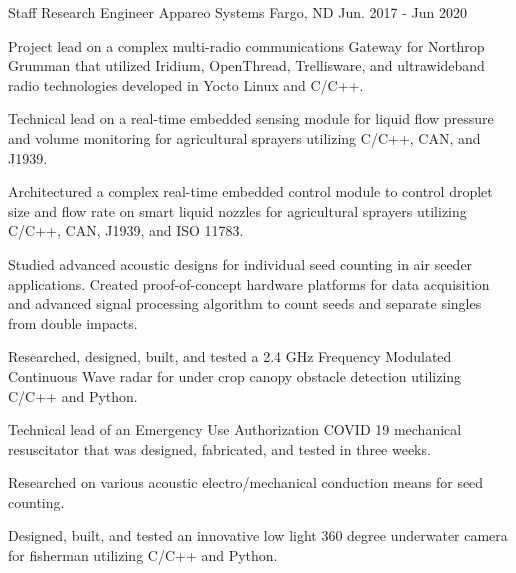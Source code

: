 \begin{cventries}
  \cventry
    {Staff Research Engineer} %
    {Appareo Systems} %
    {Fargo, ND} %
    {Jun. 2017 - Jun 2020} %
    {
      \begin{cvitems} %
        \item {Project lead on a complex multi-radio communications Gateway for Northrop Grumman that utilized Iridium, OpenThread, Trellisware, and ultrawideband radio technologies developed in Yocto Linux and C/C++.}
        \item {Technical lead on a real-time embedded sensing module for liquid flow pressure and volume monitoring for agricultural sprayers utilizing C/C++, CAN, and J1939.}
        \item {Architectured a complex real-time embedded control module to control droplet size and flow rate on smart liquid nozzles for agricultural sprayers utilizing C/C++, CAN, J1939, and ISO 11783.}
        \item {Studied advanced acoustic designs for individual seed counting in air seeder applications. Created proof-of-concept hardware platforms for data acquisition and advanced signal processing algorithm to count seeds and separate singles from double impacts.}
        \item {Researched, designed, built, and tested a 2.4 GHz Frequency Modulated Continuous Wave radar for under crop canopy obstacle detection utilizing C/C++ and Python.}
        \item {Technical lead of an Emergency Use Authorization COVID 19 mechanical resuscitator that was designed, fabricated, and tested in three weeks.}
        \item {Researched on various acoustic electro/mechanical conduction means for seed counting.}
        \item {Designed, built, and tested an innovative low light 360 degree underwater camera for fisherman utilizing C/C++ and Python.}
      \end{cvitems}
    }


\end{cventries}
